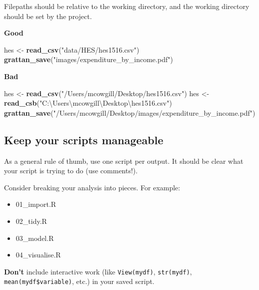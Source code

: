 \documentclass[]{book}
\newenvironment{Shaded}{\begin{snugshade}}{\end{snugshade}}
\newcommand{\KeywordTok}[1]{\textcolor[rgb]{0.13,0.29,0.53}{\textbf{#1}}}
\newcommand{\NormalTok}[1]{#1}
\newcommand{\StringTok}[1]{\textcolor[rgb]{0.31,0.60,0.02}{#1}}
\providecommand{\tightlist}{%
  \setlength{\itemsep}{0pt}\setlength{\parskip}{0pt}}
\begin{document}
Filepaths should be relative to the working directory, and the working directory should be set by the project.

\textbf{Good}

\begin{Shaded}
\begin{Highlighting}[]
\NormalTok{hes <-}\StringTok{ }\KeywordTok{read_csv}\NormalTok{(}\StringTok{"data/HES/hes1516.csv"}\NormalTok{)}
\KeywordTok{grattan_save}\NormalTok{(}\StringTok{"images/expenditure_by_income.pdf"}\NormalTok{)}
\end{Highlighting}
\end{Shaded}

\textbf{Bad}

\begin{Shaded}
\begin{Highlighting}[]
\NormalTok{hes <-}\StringTok{ }\KeywordTok{read_csv}\NormalTok{(}\StringTok{"/Users/mcowgill/Desktop/hes1516.csv"}\NormalTok{)}
\NormalTok{hes <-}\StringTok{ }\KeywordTok{read_csb}\NormalTok{(}\StringTok{"C:\textbackslash{}Users\textbackslash{}mcowgill\textbackslash{}Desktop\textbackslash{}hes1516.csv"}\NormalTok{)}
\KeywordTok{grattan_save}\NormalTok{(}\StringTok{"/Users/mcowgill/Desktop/images/expenditure_by_income.pdf"}\NormalTok{)}
\end{Highlighting}
\end{Shaded}

\hypertarget{keep-your-scripts-manageable}{%
\subsection{Keep your scripts manageable}\label{keep-your-scripts-manageable}}

As a general rule of thumb, use one script per output. It should be clear what your script is trying to do (use comments!).

Consider breaking your analysis into pieces. For example:

\begin{itemize}
\tightlist
\item
  01\_import.R
\item
  02\_tidy.R
\item
  03\_model.R
\item
  04\_visualise.R
\end{itemize}

\textbf{Don't} include interactive work (like \texttt{View(mydf)}, \texttt{str(mydf)}, \texttt{mean(mydf\$variable)}, etc.) in your saved script.
\end{document}
